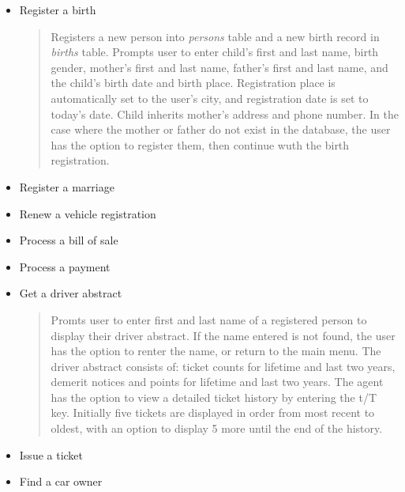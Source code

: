 \documentclass[10pt, a4paper]{article}
\begin{document}
{\begin{itemize}
\item Register a birth
	\begin{quotation}
	\noindent Registers a new person into \emph{persons} table and a new birth record in \emph{births} table. Prompts user to enter child's first and last name, birth gender, mother's first and last name, father's first and last name, and the child's birth date and birth place. Registration place is automatically set to the user's city, and registration date is set to today's date. Child inherits mother's address and phone number. In the case where the mother or father do not exist in the database, the user has the option to register them, then continue wuth the birth registration. 
	\end{quotation}
\item Register a marriage
\item Renew a vehicle registration
\item Process a bill of sale
\item Process a payment

\item Get a driver abstract
	\begin{quotation}
	\noindent Promts user to enter first and last name of a registered person to display their driver abstract. If the name entered is not found, the user has the option to renter the name, or return to the main menu. The driver abstract consists of: ticket counts for lifetime and last two years, demerit notices and points for lifetime and last two years. The agent has the option to view a detailed ticket history by entering the t/T key. Initially five tickets are displayed in order from most recent to oldest, with an option to display 5 more until the end of the history.
	\end{quotation}

\item Issue a ticket
\item Find a car owner
\end{itemize}

}
\end{document}
